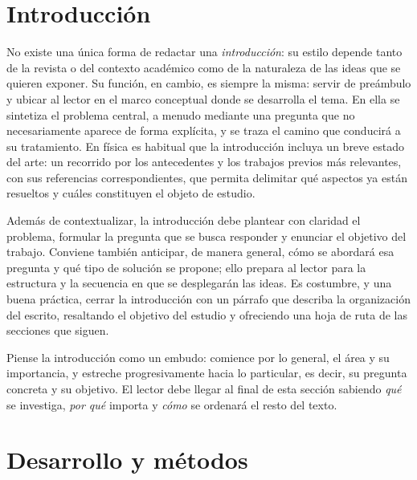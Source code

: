 \documentclass[11pt,letterpaper]{article}
\begin{document}
\section{Introducción}\label{sec:introduccion}

No existe una única forma de redactar una \textit{introducción}: su estilo depende
tanto de la revista o del contexto académico como de la naturaleza de las ideas que
se quieren exponer. Su función, en cambio, es siempre la misma: servir de preámbulo
y ubicar al lector en el marco conceptual donde se desarrolla el tema. En ella se
sintetiza el problema central, a menudo mediante una pregunta que no necesariamente
aparece de forma explícita, y se traza el camino que conducirá a su tratamiento. En
física es habitual que la introducción incluya un breve estado del arte: un recorrido
por los antecedentes y los trabajos previos más relevantes, con sus referencias
correspondientes, que permita delimitar qué aspectos ya están resueltos y cuáles
constituyen el objeto de estudio.

Además de contextualizar, la introducción debe plantear con claridad el problema,
formular la pregunta que se busca responder y enunciar el objetivo del trabajo.
Conviene también anticipar, de manera general, cómo se abordará esa pregunta y qué
tipo de solución se propone; ello prepara al lector para la estructura y la secuencia
en que se desplegarán las ideas. Es costumbre, y una buena práctica, cerrar la
introducción con un párrafo que describa la organización del escrito, resaltando el
objetivo del estudio y ofreciendo una hoja de ruta de las secciones que siguen.

\begin{consejo}
Piense la introducción como un embudo: comience por lo general, el área y su
importancia, y estreche progresivamente hacia lo particular, es decir, su pregunta concreta y
su objetivo. El lector debe llegar al final de esta sección sabiendo \emph{qué} se
investiga, \emph{por qué} importa y \emph{cómo} se ordenará el resto del texto.
\end{consejo}

\section{Desarrollo y métodos}\label{sec:desarrollo}
\end{document}
